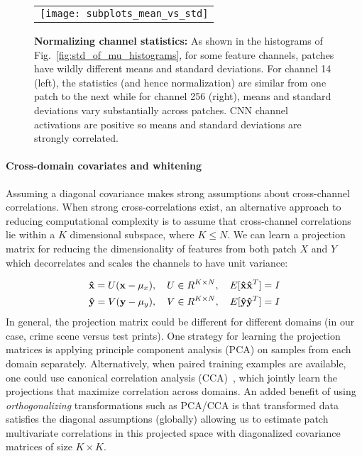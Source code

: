 \documentclass[twocolumn]{svjour3}           %
\begin{document}
\begin{figure}[t]
\begin{center}
\begin{tabular}{c}
  \texttt{[image: subplots\_mean\_vs\_std]}
  \end{tabular}\vspace{-2mm}
  \end{center}
  \caption{\textbf{Normalizing channel statistics: } As shown in the histograms
  of Fig.~\ref{fig:std_of_mu_histograms}, for some feature channels, patches
  have wildly different means and standard deviations. For channel 14 (left),
  the statistics (and hence normalization) are similar from one patch to the
  next while for channel 256 (right), means and standard deviations vary
  substantially across patches. CNN channel activations are positive so means
  and standard deviations are strongly correlated.}
  \label{fig:mean_vs_std}
\end{figure}

\paragraph{Cross-domain covariates and whitening} Assuming a diagonal covariance
makes strong assumptions about cross-channel correlations.  When strong
cross-correlations exist, an alternative approach to reducing computational
complexity is to assume that cross-channel correlations lie within a $K$
dimensional subspace, where $K \leq N$. We can learn a projection matrix for
reducing the dimensionality of features from both patch $X$ and $Y$ which
decorrelates and scales the channels to have unit variance:

{\small
\begin{align*}
{\bf \hat{x}} = U ({\bf x} - \mu_x), \quad U \in R^{K \times N}, \quad E[{\bf \hat{x}} {\bf \hat{x}}^T] = I\\
{\bf \hat{y}} = V ({\bf y} - \mu_y), \quad V \in R^{K \times N}, \quad E[{\bf \hat{y}} {\bf \hat{y}}^T] = I
\end{align*}}
In general, the projection matrix could be different for different domains (in
our case, crime scene versus test prints). One strategy for learning the projection
matrices is applying principle component analysis (PCA) on samples from each domain
separately. Alternatively, when paired training examples are available, one
could use canonical correlation analysis (CCA)~\cite{MardiaKentBibby1980}, which
jointly learn the projections that maximize correlation across domains.
An added benefit of using {\em orthogonalizing}
transformations such as PCA/CCA is that transformed data satisfies the diagonal
assumptions (globally) allowing us to estimate patch multivariate correlations
in this projected space with diagonalized covariance matrices of size $K \times
K$. 
\end{document}
